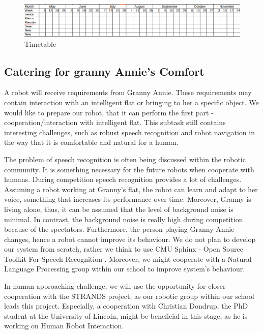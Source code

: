 \documentclass[conference]{IEEEtran}
\begin{document}
\begin{figure}[!htb]
\centering
\includegraphics[width=\textwidth]{timetable.png}
\caption{Timetable}
\label{fig:plan}
\end{figure}

\subsection{Catering for granny Annie’s Comfort}

A robot will receive requirements from Granny Annie. These requirements may contain interaction with an intelligent flat or bringing to her a specific object. We would like to prepare our robot, that it can perform the first part - cooperation/interaction with intelligent flat. This subtask still contains interesting challenges, such as robust speech recognition and robot navigation in the way that it is comfortable and natural for a human. %

The problem of speech recognition is often being discussed within the robotic community. It is something necessary for the future robots when cooperate with humans. During competition speech recognition provides a lot of challenges. Assuming a robot working at Granny's flat, the robot can learn and adapt to her voice, something that increases its performance over time. Moreover, Granny is living alone, thus, it can be assumed that the level of background noise is minimal. In contrast, the background noise is really high during competition because of the spectators. Furthermore, the person playing Granny Annie changes, hence a robot cannot improve its behaviour. We do not plan to develop our system from scratch, rather we think to use CMU Sphinx - Open Source Toolkit For Speech Recognition \cite{cmu}. %
Moreover, we might cooperate with a Natural Language Processing group within our school to improve system's behaviour.

In human approaching challenge, we will use the opportunity for closer cooperation with the STRANDS \cite{strands} project, as our robotic group within our school leads this project. Especially, a cooperation with Christian Dondrup, the PhD student at the University of Lincoln, might be beneficial in this stage, as he is working on Human Robot Interaction.
\end{document}
